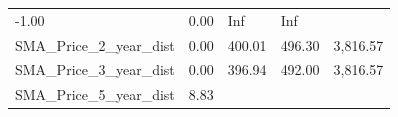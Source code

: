 \documentclass[]{article}
\begin{document}
\begin{longtable}[]{@{}lllll@{}}
\begin{minipage}[t]{0.08\columnwidth}
-1.00\strut
\end{minipage} & \begin{minipage}[t]{0.09\columnwidth}\raggedright\strut
0.00\strut
\end{minipage} & \begin{minipage}[t]{0.09\columnwidth}\raggedright\strut
Inf\strut
\end{minipage} & \begin{minipage}[t]{0.11\columnwidth}\raggedright\strut
Inf\strut
\end{minipage}\tabularnewline
\begin{minipage}[t]{0.49\columnwidth}\raggedright\strut
SMA\_Price\_2\_year\_dist\strut
\end{minipage} & \begin{minipage}[t]{0.08\columnwidth}\raggedright\strut
0.00\strut
\end{minipage} & \begin{minipage}[t]{0.09\columnwidth}\raggedright\strut
400.01\strut
\end{minipage} & \begin{minipage}[t]{0.09\columnwidth}\raggedright\strut
496.30\strut
\end{minipage} & \begin{minipage}[t]{0.11\columnwidth}\raggedright\strut
3,816.57\strut
\end{minipage}\tabularnewline
\begin{minipage}[t]{0.49\columnwidth}\raggedright\strut
SMA\_Price\_3\_year\_dist\strut
\end{minipage} & \begin{minipage}[t]{0.08\columnwidth}\raggedright\strut
0.00\strut
\end{minipage} & \begin{minipage}[t]{0.09\columnwidth}\raggedright\strut
396.94\strut
\end{minipage} & \begin{minipage}[t]{0.09\columnwidth}\raggedright\strut
492.00\strut
\end{minipage} & \begin{minipage}[t]{0.11\columnwidth}\raggedright\strut
3,816.57\strut
\end{minipage}\tabularnewline
\begin{minipage}[t]{0.49\columnwidth}\raggedright\strut
SMA\_Price\_5\_year\_dist\strut
\end{minipage} & \begin{minipage}[t]{0.08\columnwidth}\raggedright\strut
8.83\strut
\end{minipage} & \begin{minipage}[t]{0.09\columnwidth}\raggedright\strut

\end{minipage}
\end{longtable}
\end{document}
